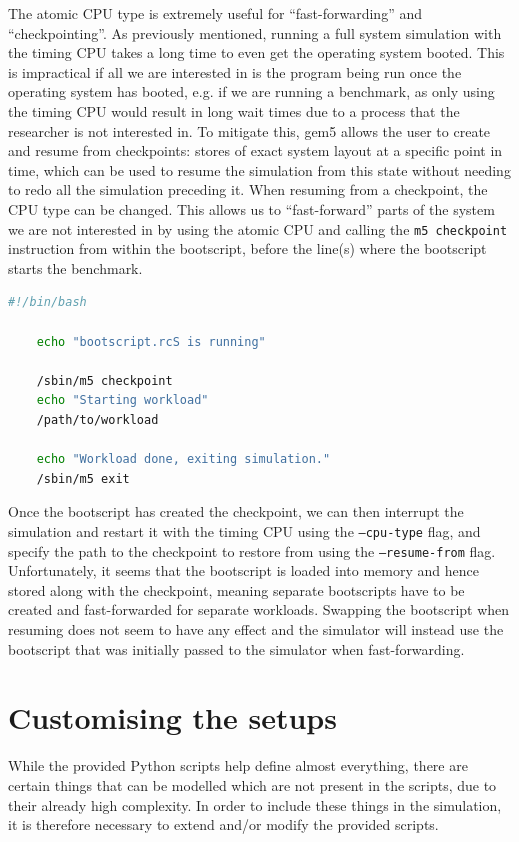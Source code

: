     The atomic CPU type is extremely useful for ``fast-forwarding'' and 
    ``checkpointing''. As previously mentioned, running a full system 
    simulation with the timing CPU takes a long time to even get the operating 
    system booted. This is impractical if all we are interested in is the 
    program being run once the operating system has booted, e.g. if we are 
    running a benchmark, as only using the timing CPU would result in long wait 
    times due to a process that the researcher is not interested in. To mitigate
    this, gem5 allows the user to create and resume from checkpoints: stores of 
    exact system layout at a specific point in time, which can be used to resume
    the simulation from this state without needing to redo all the simulation 
    preceding it. When resuming from a checkpoint, the CPU type can be changed.
    This allows us to ``fast-forward'' parts of the system we are not interested
    in by using the atomic CPU and calling the \texttt{m5 checkpoint} 
    instruction from within the bootscript, before the line(s) where the 
    bootscript starts the benchmark.
    \begin{lstlisting}[language=bash, caption=Example bootscript using 
    checkpointing, basicstyle=\sffamily\footnotesize]
    #!/bin/bash
    
    echo "bootscript.rcS is running"
    
    /sbin/m5 checkpoint
    echo "Starting workload"
    /path/to/workload
    
    echo "Workload done, exiting simulation."
    /sbin/m5 exit
    \end{lstlisting}
    Once the bootscript has created the checkpoint, we can then interrupt the 
    simulation and restart it with the timing CPU using the \texttt{--cpu-type} 
    flag, and specify the path to the checkpoint to restore from using the 
    \texttt{--resume-from} flag. Unfortunately, it seems that the bootscript is 
    loaded into memory and hence stored along with the checkpoint, meaning 
    separate bootscripts have to be created and fast-forwarded for separate 
    workloads. Swapping the bootscript when resuming does not seem to have any 
    effect and the simulator will instead use the bootscript that was initially 
    passed to the simulator when fast-forwarding.
    
\section{Customising the setups}
While the provided Python scripts help define almost everything, there are 
certain things that can be modelled which are not present in the scripts, due to
their already high complexity. In order to include these things in the 
simulation, it is therefore necessary to extend and/or modify the provided 
scripts.

